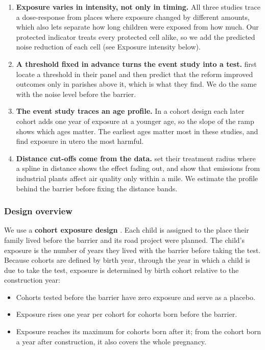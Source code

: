 \documentclass[11pt]{article}
\begin{document}
\begin{enumerate}
\item \textbf{Exposure varies in intensity, not only in timing.} All three studies trace a dose-response from places where exposure changed by different amounts, which also lets \textcite{hollingsworthThousandCutsCumulative2025} separate how long children were exposed from how much. Our protected indicator treats every protected cell alike, so we add the predicted noise reduction of each cell (see Exposure intensity below).
\item \textbf{A threshold fixed in advance turns the event study into a test.} \textcite{gronqvistUnderstandingHowLow2020} first locate a threshold in their panel and then predict that the reform improved outcomes only in parishes above it, which is what they find. We do the same with the noise level before the barrier.
\item \textbf{The event study traces an age profile.} In a cohort design each later cohort adds one year of exposure at a younger age, so the slope of the ramp shows which ages matter. The earliest ages matter most in these studies, and \textcite{berkhoutLeadExposureCognitive2025} find exposure in utero the most harmful.
\item \textbf{Distance cut-offs come from the data.} \textcite{hollingsworthThousandCutsCumulative2025} set their treatment radius where a spline in distance shows the effect fading out, and \textcite{currieEnvironmentalHealthRisks2015} show that emissions from industrial plants affect air quality only within a mile. We estimate the profile behind the barrier before fixing the distance bands.
\end{enumerate}

\subsubsection{Design overview}

We use a \textbf{cohort exposure design} \autocite{dufloSchoolingLaborMarket2001}. Each child is assigned to the place their family lived before the barrier and its road project were planned. The child's exposure is the number of years they lived with the barrier before taking the test. Because cohorts are defined by birth year, through the year in which a child is due to take the test, exposure is determined by birth cohort relative to the construction year:

\begin{itemize}
\item Cohorts tested before the barrier have zero exposure and serve as a placebo.
\item Exposure rises one year per cohort for cohorts born before the barrier.
\item Exposure reaches its maximum for cohorts born after it; from the cohort born a year after construction, it also covers the whole pregnancy.
\end{itemize}
\end{document}
